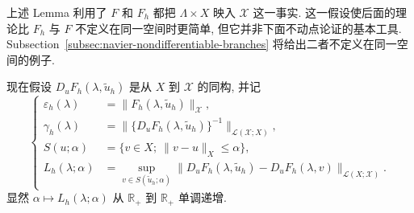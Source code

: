 \setcounter{statement}{0}
\begin{Remark}\label{rem:navier-branch-common-range-space}
上述 Lemma 利用了 $F$ 和 $F_h$ 都把 $\Lambda\times X$ 映入 $\mathscr X$ 这一事实.
这一假设使后面的理论比 $F_h$ 与 $F$ 不定义在同一空间时更简单, 但它并非下面不动点论证的基本工具.
Subsection~\ref{subsec:navier-nondifferentiable-branches} 将给出二者不定义在同一空间的例子.
\end{Remark}

现在假设 $D_uF_h(\lambda,\widetilde u_h)$ 是从 $X$ 到 $\mathscr X$ 的同构, 并记
\begin{equation}\label{eq:navier-branch-local-quantities}
\left\{
\begin{aligned}
\varepsilon_h(\lambda)&=\|F_h(\lambda,\widetilde u_h)\|_{\mathscr X},\\
\gamma_h(\lambda)&=\|\{D_uF_h(\lambda,\widetilde u_h)\}^{-1}\|_{\mathcal L(\mathscr X;X)},\\
S(u;\alpha)&=\{v\in X;\ \|v-u\|_X\leq\alpha\},\\
L_h(\lambda;\alpha)&=
\sup_{v\in S(\widetilde u_h;\alpha)}
\|D_uF_h(\lambda,\widetilde u_h)-D_uF_h(\lambda,v)\|_{\mathcal L(X;\mathscr X)}.
\end{aligned}
\right.
\end{equation}
显然 $\alpha\mapsto L_h(\lambda;\alpha)$ 从 $\mathbb R_+$ 到 $\mathbb R_+$ 单调递增.


